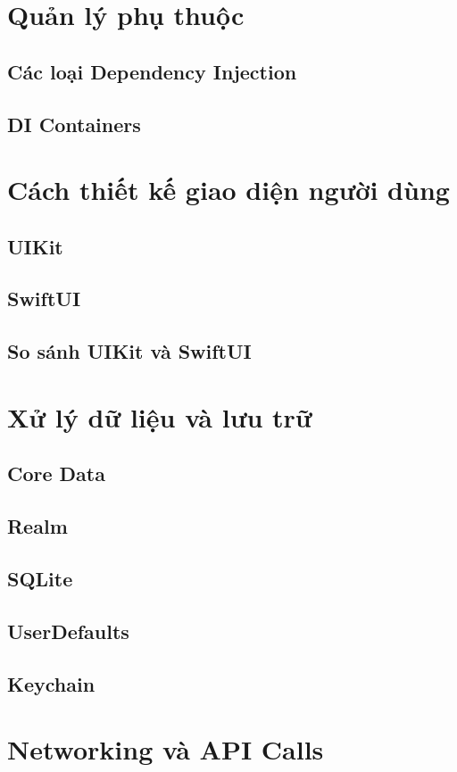 \section{Quản lý phụ thuộc
}
    \subsection{Các loại Dependency Injection}
    \subsection{DI Containers}
\section{Cách thiết kế giao diện người dùng}
    \subsection{UIKit}
    \subsection{SwiftUI}
    \subsection{So sánh UIKit và SwiftUI}
\section{Xử lý dữ liệu và lưu trữ}
    \subsection{Core Data}
    \subsection{Realm}
    \subsection{SQLite}
    \subsection{UserDefaults}
    \subsection{Keychain}
\section{Networking và API Calls}
